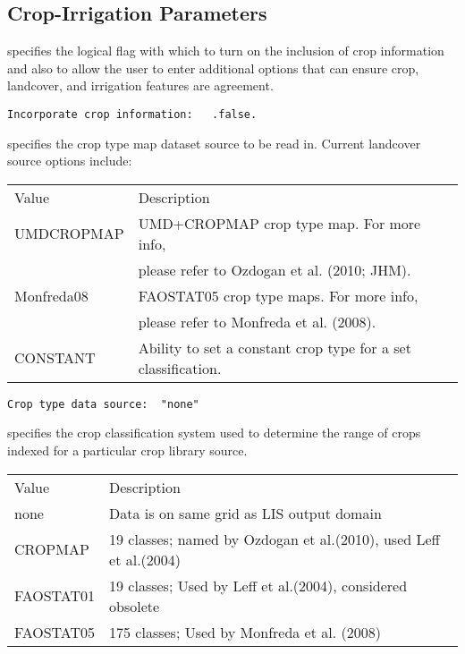  
 \subsection{Crop-Irrigation Parameters} \label{ssec:cropirrigparams}
 


 
  specifies the logical flag
 with which to turn on the inclusion of crop information and also 
 to allow the user to enter additional options that can ensure
 crop, landcover, and irrigation features are agreement.
 

 \begin{Verbatim}[frame=single]
Incorporate crop information:   .false.
 \end{Verbatim}

 
  specifies the crop type map
 dataset source to be read in.
 Current landcover source options include:

 \begin{tabular}{ll}
 Value         & Description               \\
 UMDCROPMAP    & UMD+CROPMAP crop type map.  For more info,  \\
               &   please refer to Ozdogan et al. (2010; JHM).  \\
 Monfreda08    & FAOSTAT05 crop type maps.  For more info,  \\
               &   please refer to Monfreda et al. (2008).  \\
 CONSTANT      & Ability to set a constant crop type for a set classification. \\
 \end{tabular}
 

 \begin{Verbatim}[frame=single]
Crop type data source:  "none" 
 \end{Verbatim}

 
  specifies the crop classification
 system used to determine the range of crops indexed for a particular
 crop library source.

 \begin{tabular}{ll}
 Value     & Description                                          \\
 none      &  Data is on same grid as LIS output domain           \\
 CROPMAP   &   19 classes; named by Ozdogan et al.(2010), used Leff et al.(2004) \\
 FAOSTAT01 &   19 classes; Used by Leff et al.(2004), considered obsolete \\
 FAOSTAT05 &  175 classes; Used by Monfreda et al. (2008) \\
 \end{tabular}
 

